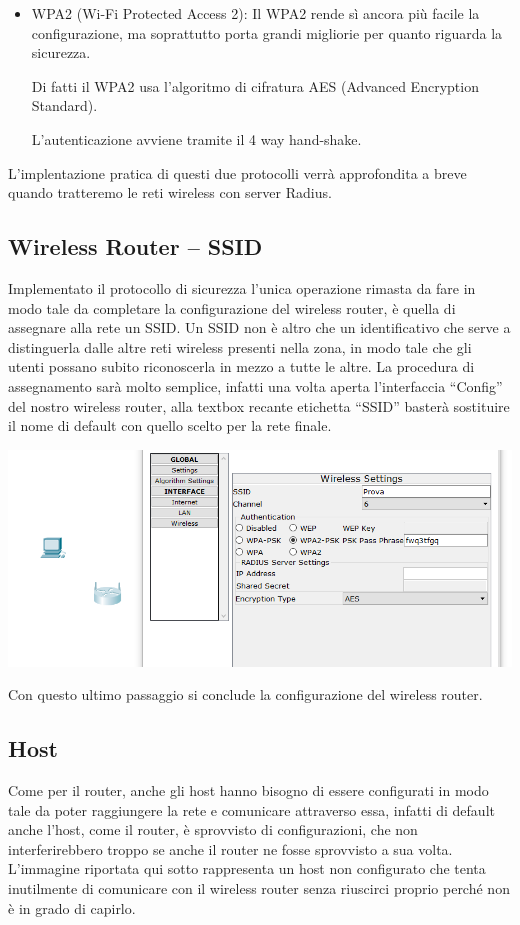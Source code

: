 \begin{itemize}
    \item WPA2 (Wi-Fi Protected Access 2): Il WPA2 rende sì ancora più facile la configurazione, ma soprattutto porta grandi migliorie per quanto riguarda la sicurezza.
    
    Di fatti il WPA2 usa l’algoritmo di cifratura AES (Advanced Encryption Standard).

    L’autenticazione avviene tramite il 4 way hand-shake.
\end{itemize}

L’implentazione pratica di questi due protocolli verrà approfondita a breve quando tratteremo le reti wireless con server Radius.

\subsection{Wireless Router – SSID}
Implementato il protocollo di sicurezza l’unica operazione rimasta da fare in modo tale da completare la configurazione del wireless router, è quella di assegnare alla rete un SSID. Un SSID non è altro che un identificativo che serve a distinguerla dalle altre reti wireless presenti nella zona, in modo tale che gli utenti possano subito riconoscerla in mezzo a tutte le altre. La procedura di assegnamento sarà molto semplice, infatti una volta aperta l’interfaccia “Config” del nostro wireless router, alla textbox recante etichetta “SSID” basterà sostituire il nome di default con quello scelto per la rete finale.

\begin{center}
    \includegraphics[width=\linewidth]{images/08.wireless/10.png}
\end{center}

Con questo ultimo passaggio si conclude la configurazione del wireless router.

\subsection{Host}
Come per il router, anche gli host hanno bisogno di essere configurati in modo tale da poter raggiungere la rete e comunicare attraverso essa, infatti di default anche l’host, come il router, è sprovvisto di configurazioni, che non interferirebbero troppo se anche il router ne fosse sprovvisto a sua volta. L’immagine riportata qui sotto rappresenta un host non configurato che tenta inutilmente di comunicare con il wireless router senza riuscirci proprio perché non è in grado di capirlo.

